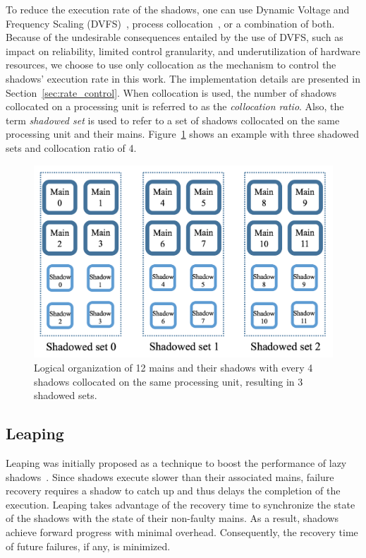 To reduce the execution rate of the shadows, one can use Dynamic Voltage and Frequency Scaling (DVFS)~\cite{cui_en7085151}, process collocation~\cite{cui_2016_scalcom}, or a combination of both. Because of the undesirable consequences entailed by the use of DVFS, such as impact on reliability, limited control granularity, and underutilization of hardware resources, we choose to use only collocation as the mechanism to control the shadows' execution rate in this work. The implementation details are presented in Section~\ref{sec:rate_control}. When collocation is used, the number of shadows collocated on a processing unit is referred to as the \textit{collocation ratio}. Also, the term \textit{shadowed set} is used to refer to a set of shadows collocated on the same processing unit and their mains. Figure~\ref{fig:logical_org} shows an example with three shadowed sets and collocation ratio of 4.

\begin{figure}[!t]
  \begin{center}
      \includegraphics[width=0.9\columnwidth]{figures/logical_org_3}
  \end{center}
  \caption{Logical organization of 12 mains and their shadows with every 4 shadows collocated on the same processing unit, resulting in 3 shadowed sets.}
  \label{fig:logical_org}
\end{figure}

\subsection{Leaping}

Leaping was initially proposed as a technique to boost the performance of lazy shadows~\cite{cui_2016_scalcom}. Since shadows execute slower than their associated mains, failure recovery requires a shadow to catch up and thus delays the completion of the  execution. Leaping takes advantage of the recovery time to synchronize the state of the shadows with the state of their non-faulty mains. As a result, shadows achieve forward progress with minimal overhead. Consequently, the recovery time of future failures, if any, is minimized. 

